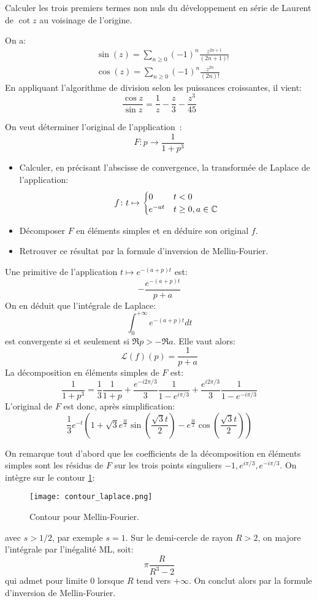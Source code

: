 \begin{fex} 
    Calculer les trois premiers termes non nuls du développement en série de Laurent de $\cot z$ au voisinage de l'origine.
\end{fex} 
On a:
\[
\begin{split}
    & \sin(z) = \sum_{n\geq 0} (-1)^n \frac{z^{2n+1}}{(2n+1)!} \\
     & \cos(z) = \sum_{n\geq 0} (-1)^n \frac{z^{2n}}{(2n)!}
\end{split}
\]
En appliquant l'algorithme de division selon les puissances croissantes, il vient:
\[
\frac{\cos z}{\sin z} = \frac{1}{z} - \frac{z}{3} - \frac{z^3}{45}
\]
\begin{fex} 
On veut déterminer l'original de l'application~:
\[
F : p \to \frac{1}{1+p^3}
\]
\begin{itemize} 
\item Calculer, en précisant l'abscisse de convergence, la transformée de Laplace de l'application:
\[
f \colon t \mapsto \begin{cases}
    0 & t< 0 \\
    e^{-at} & t \geq 0, a \in \mathbb{C}
\end{cases}
\]
\item Décomposer $F$ en éléments simples et en déduire son original $f.$
\item Retrouver ce résultat par la formule d'inversion de Mellin-Fourier.
\end{itemize} 
\end{fex} 
Une primitive de l'application $t \mapsto e^{-(a+p)t}$ est:
\[
-\frac{e^{-(a+p)t}}{p+a}
\]
On en déduit que l'intégrale de Laplace:
\[
\int_0^{+\infty} e^{-(a+p)t} dt
\]
est convergente si et seulement si $\Re{p}> -\Re{a}.$
Elle vaut alors:
\[
\mathcal{L}(f)(p) = \frac{1}{p+a}
\]
La décomposition en éléments simples de $F$ est:
\[
\frac{1}{1+p^3} = \frac{1}{3} \frac{1}{1+p}
+\frac{e^{-i 2 \pi /3}}{3}\frac{1}{1-e^{i\pi /3}} 
+\frac{e^{i 2 \pi /3}}{3}\frac{1}{1-e^{-i \pi /3}}
\]
L'original de $F$ est donc, après simplification:
\[
\frac{1}{3} e^{-t} \left(1+\sqrt{3} e^{\frac{3 t}{2}} \sin \left(\frac{\sqrt{3} t}{2}\right) -e^{\frac{3 t}{2}} \cos \left(\frac{\sqrt{3} t}{2}\right)\right)
\]

On remarque tout d'abord que les coefficients de la décomposition en éléments simples sont les résidus de $F$ sur les trois points singuliers $-1,e^{i \pi/3},e^{-i \pi /3}.$ On intègre sur le contour \ref{fig:contour_laplace}:
\begin{figure}
    \centering
    \texttt{[image: contour\_laplace.png]}
    \caption{Contour pour Mellin-Fourier.}
    \label{fig:contour_laplace}
\end{figure}
avec $s > 1/2$, par exemple $s=1.$
Sur le demi-cercle de rayon $R > 2$, on majore l'intégrale par l'inégalité ML, soit:
\[
\pi \frac{R}{R^3-2} 
\]
qui admet pour limite $0$ lorsque $R$ tend vers $+\infty$.
On conclut alors par la formule d'inversion de Mellin-Fourier.
 